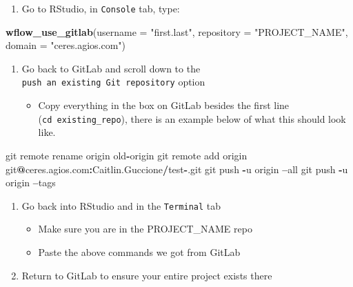 \documentclass[openany]{article}
\newenvironment{Shaded}{\begin{snugshade}}{\end{snugshade}}
\newcommand{\DataTypeTok}[1]{\textcolor[rgb]{0.13,0.29,0.53}{#1}}
\newcommand{\KeywordTok}[1]{\textcolor[rgb]{0.13,0.29,0.53}{\textbf{#1}}}
\newcommand{\NormalTok}[1]{#1}
\newcommand{\OperatorTok}[1]{\textcolor[rgb]{0.81,0.36,0.00}{\textbf{#1}}}
\newcommand{\StringTok}[1]{\textcolor[rgb]{0.31,0.60,0.02}{#1}}
\providecommand{\tightlist}{%
  \setlength{\itemsep}{0pt}\setlength{\parskip}{0pt}}
\begin{document}
\begin{enumerate}
\def\labelenumi{\arabic{enumi}.}
\tightlist
\item
  Go to RStudio, in \texttt{Console} tab, type:
\end{enumerate}

\begin{Shaded}
\begin{Highlighting}[]
 \KeywordTok{wflow_use_gitlab}\NormalTok{(}\DataTypeTok{username =} \StringTok{"first.last"}\NormalTok{, }\DataTypeTok{repository =} \StringTok{"PROJECT_NAME"}\NormalTok{, }\DataTypeTok{domain =} \StringTok{"ceres.agios.com"}\NormalTok{)}
\end{Highlighting}
\end{Shaded}

\begin{enumerate}
\def\labelenumi{\arabic{enumi}.}
\setcounter{enumi}{1}
\tightlist
\item
  Go back to GitLab and scroll down to the \texttt{push\ an\ existing\ Git\ repository} option

  \begin{itemize}
  \tightlist
  \item
    Copy everything in the box on GitLab besides the first line (\texttt{cd\ existing\_repo}), there is an example below of what this should look like.
  \end{itemize}
\end{enumerate}

\begin{Shaded}
\begin{Highlighting}[]
\NormalTok{git remote rename origin old}\OperatorTok{-}\NormalTok{origin}
\NormalTok{git remote add origin git}\OperatorTok{@}\NormalTok{ceres.agios.com}\OperatorTok{:}\NormalTok{Caitlin.Guccione}\OperatorTok{/}\NormalTok{test}\OperatorTok{-}\NormalTok{.git}
\NormalTok{git push }\OperatorTok{-}\NormalTok{u origin }\OperatorTok{--}\NormalTok{all}
\NormalTok{git push }\OperatorTok{-}\NormalTok{u origin }\OperatorTok{--}\NormalTok{tags}
\end{Highlighting}
\end{Shaded}

\begin{enumerate}
\def\labelenumi{\arabic{enumi}.}
\setcounter{enumi}{2}
\tightlist
\item
  Go back into RStudio and in the \texttt{Terminal} tab

  \begin{itemize}
  \tightlist
  \item
    Make sure you are in the PROJECT\_NAME repo
  \item
    Paste the above commands we got from GitLab
  \end{itemize}
\item
  Return to GitLab to ensure your entire project exists there
\end{enumerate}
\end{document}
